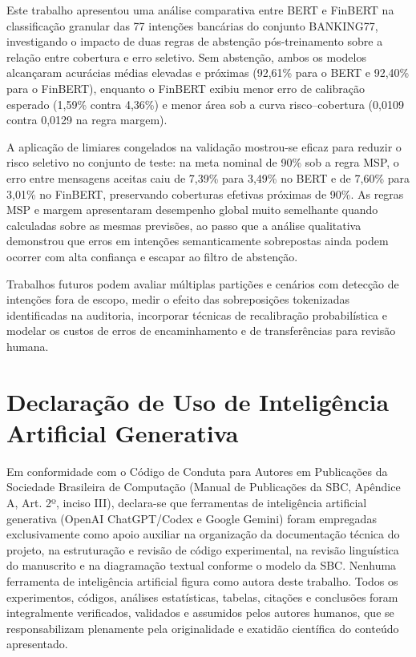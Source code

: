 \documentclass[12pt,a4paper]{article}
\begin{document}
Este trabalho apresentou uma análise comparativa entre BERT e FinBERT na classificação granular das 77 intenções bancárias do conjunto BANKING77, investigando o impacto de duas regras de abstenção pós-treinamento sobre a relação entre cobertura e erro seletivo. Sem abstenção, ambos os modelos alcançaram acurácias médias elevadas e próximas (92,61\% para o BERT e 92,40\% para o FinBERT), enquanto o FinBERT exibiu menor erro de calibração esperado (1,59\% contra 4,36\%) e menor área sob a curva risco–cobertura (0,0109 contra 0,0129 na regra margem).

A aplicação de limiares congelados na validação mostrou-se eficaz para reduzir o risco seletivo no conjunto de teste: na meta nominal de 90\% sob a regra MSP, o erro entre mensagens aceitas caiu de 7,39\% para 3,49\% no BERT e de 7,60\% para 3,01\% no FinBERT, preservando coberturas efetivas próximas de 90\%. As regras MSP e margem apresentaram desempenho global muito semelhante quando calculadas sobre as mesmas previsões, ao passo que a análise qualitativa demonstrou que erros em intenções semanticamente sobrepostas ainda podem ocorrer com alta confiança e escapar ao filtro de abstenção.

Trabalhos futuros podem avaliar múltiplas partições e cenários com detecção de intenções fora de escopo, medir o efeito das sobreposições tokenizadas identificadas na auditoria, incorporar técnicas de recalibração probabilística e modelar os custos de erros de encaminhamento e de transferências para revisão humana.

\section*{\textbf{Declaração de Uso de Inteligência Artificial Generativa}}

Em conformidade com o Código de Conduta para Autores em Publicações da Sociedade Brasileira de Computação (Manual de Publicações da SBC, Apêndice A, Art. 2º, inciso III), declara-se que ferramentas de inteligência artificial generativa (OpenAI ChatGPT/Codex e Google Gemini) foram empregadas exclusivamente como apoio auxiliar na organização da documentação técnica do projeto, na estruturação e revisão de código experimental, na revisão linguística do manuscrito e na diagramação textual conforme o modelo da SBC. Nenhuma ferramenta de inteligência artificial figura como autora deste trabalho. Todos os experimentos, códigos, análises estatísticas, tabelas, citações e conclusões foram integralmente verificados, validados e assumidos pelos autores humanos, que se responsabilizam plenamente pela originalidade e exatidão científica do conteúdo apresentado.
\end{document}
